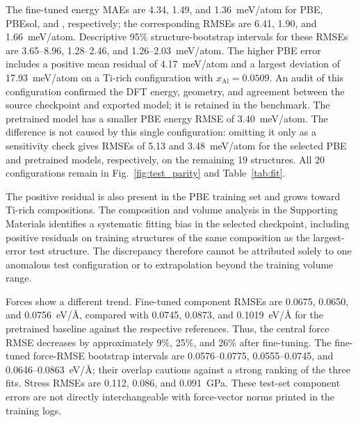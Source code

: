 The fine-tuned energy MAEs are 4.34, 1.49, and 1.36~meV/atom for PBE, PBEsol, and \rscan{}, respectively; the corresponding RMSEs are 6.41, 1.90, and 1.66~meV/atom.
Descriptive 95\% structure-bootstrap intervals for these RMSEs are 3.65--8.96, 1.28--2.46, and 1.26--2.03~meV/atom.
The higher PBE error includes a positive mean residual of 4.17~meV/atom and a largest deviation of 17.93~meV/atom on a Ti-rich configuration with $x_{\mathrm{Al}}=0.0509$.
An audit of this configuration confirmed the DFT energy, geometry, and agreement between the source checkpoint and exported model; it is retained in the benchmark.
The pretrained model has a smaller PBE energy RMSE of 3.40~meV/atom.
The difference is not caused by this single configuration: omitting it only as a sensitivity check gives RMSEs of 5.13 and 3.48~meV/atom for the selected PBE and pretrained models, respectively, on the remaining 19 structures.
All 20 configurations remain in Fig.~\ref{fig:test_parity} and Table~\ref{tab:fit}.

The positive residual is also present in the PBE training set and grows toward Ti-rich compositions.
The composition and volume analysis in the Supporting Materials identifies a systematic fitting bias in the selected checkpoint, including positive residuals on training structures of the same composition as the largest-error test structure.
The discrepancy therefore cannot be attributed solely to one anomalous test configuration or to extrapolation beyond the training volume range.

Forces show a different trend.
Fine-tuned component RMSEs are 0.0675, 0.0650, and 0.0756~eV/\AA, compared with 0.0745, 0.0873, and 0.1019~eV/\AA{} for the pretrained baseline against the respective references.
Thus, the central force RMSE decreases by approximately 9\%, 25\%, and 26\% after fine-tuning.
The fine-tuned force-RMSE bootstrap intervals are 0.0576--0.0775, 0.0555--0.0745, and 0.0646--0.0863~eV/\AA; their overlap cautions against a strong ranking of the three fits.
Stress RMSEs are 0.112, 0.086, and 0.091~GPa.
These test-set component errors are not directly interchangeable with force-vector norms printed in the training logs.


